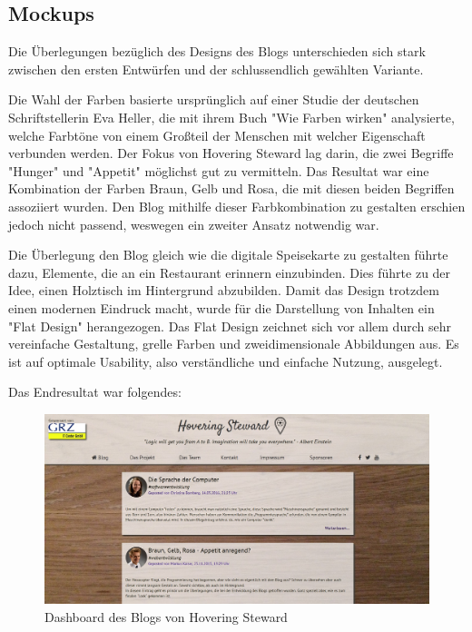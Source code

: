     \subsection*{Mockups}
    Die Überlegungen bezüglich des Designs des Blogs unterschieden sich stark zwischen den ersten
    Entwürfen und der schlussendlich gewählten Variante.

    Die Wahl der Farben basierte ursprünglich auf einer Studie der deutschen Schriftstellerin Eva Heller,
    die mit ihrem Buch {"Wie Farben wirken"\cite{WieFarbenWirken}} analysierte, welche Farbtöne von einem Großteil der Menschen
    mit welcher Eigenschaft verbunden werden. Der Fokus von Hovering Steward lag darin, die zwei Begriffe "Hunger"
    und "Appetit" möglichst gut zu vermitteln. Das Resultat war eine Kombination der Farben Braun, Gelb und Rosa, die mit diesen beiden Begriffen
    assoziiert wurden. Den Blog mithilfe dieser Farbkombination zu gestalten erschien jedoch nicht passend, weswegen
    ein zweiter Ansatz notwendig war.

    Die Überlegung den Blog gleich wie die digitale Speisekarte zu gestalten führte dazu, Elemente, die an ein Restaurant
    erinnern einzubinden. Dies führte zu der Idee, einen Holztisch im Hintergrund abzubilden.
    Damit das Design trotzdem einen modernen Eindruck macht, wurde für die Darstellung von Inhalten ein {"Flat Design"\cite{FlatDesign}}
    herangezogen. Das Flat Design zeichnet sich vor allem durch sehr vereinfache Gestaltung, grelle Farben und zweidimensionale Abbildungen aus.
    Es ist auf optimale Usability, also verständliche und einfache Nutzung, ausgelegt.

    Das Endresultat war folgendes:

    \begin{figure}[H]
      \begin{centering}
      \includegraphics[width = 1\textwidth]{Bilder/blog_dashboard.jpg}
      \par\end{centering}
      \caption{Dashboard des Blogs von Hovering Steward}
      \label{blog}
    \end{figure}


